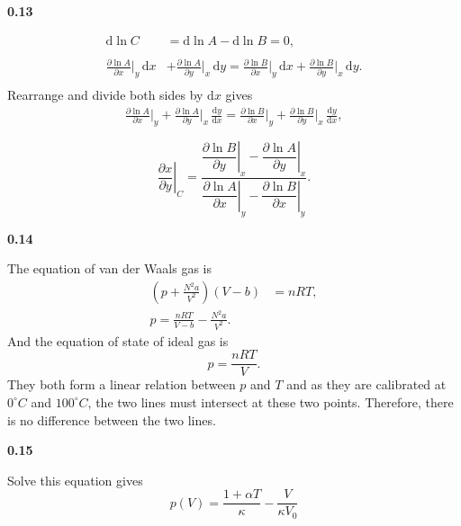 \documentclass[12pt]{article}
\newcommand{\problem}[2]{%
    \par\vspace{1em}
    \noindent\textbf{#1\quad #2}
    \par\smallskip
}
\begin{document}
\problem{0.13}{}
\begin{equation}
\begin{aligned}
     \mathrm{d}\ln{C}&= \mathrm{d}\ln{A} - \mathrm{d}\ln{B} = 0,\\
     \\
      \frac{\partial \ln{A}}{\partial x} \bigg|_y \, \mathrm{d}x &+ \frac{\partial \ln{A}}{\partial y} \bigg|_x \, \mathrm{d}y = \frac{\partial \ln{B}}{\partial x} \bigg|_y \, \mathrm{d}x + \frac{\partial \ln{B}}{\partial y} \bigg|_x \, \mathrm{d}y. \\
\end{aligned}
\end{equation}
Rearrange and divide both sides by $\mathrm{d}x$ gives
\begin{equation}
    \begin{aligned}
        \frac{\partial \ln{A}}{\partial x} \bigg|_y + \frac{\partial \ln{A}}{\partial y} \bigg|_x \, \frac{\mathrm{d}y}{\mathrm{d}x} = \frac{\partial \ln{B}}{\partial x} \bigg|_y + \frac{\partial \ln{B}}{\partial y} \bigg|_x \, \frac{\mathrm{d}y}{\mathrm{d}x},\\
        \\
    \end{aligned}
\end{equation}
\[
\left.\frac{\partial x}{\partial y}\right|_C
=
\frac{
\left.\dfrac{\partial\ln B}{\partial y}\right|_x
-
\left.\dfrac{\partial\ln A}{\partial y}\right|_x
}{
\left.\dfrac{\partial\ln A}{\partial x}\right|_y
-
\left.\dfrac{\partial\ln B}{\partial x}\right|_y
}.
\]


\problem{0.14}{}
The equation of van der Waals gas is
\begin{equation}
    \begin{aligned}
      \left(p + \frac{N^2a}{V^2}\right)(V-b) &= nRT,\\
      p = \frac{nRT}{V-b} - \frac{N^2a}{V^2}.
    \end{aligned}
\end{equation}
And the equation of state of ideal gas is
\begin{equation}
    p = \frac{nRT}{V}.
\end{equation}
They both form a linear relation between $p$ and $T$ and as they are calibrated at $0^\circ C$ and $100^\circ C$, the two lines must intersect at these two points. Therefore, there is no difference between the two lines.

\pagebreak

\problem{0.15}{}
Solve this equation gives
\begin{equation}
    p(V) = \frac{1 + \alpha T}{\kappa} - \frac{V}{\kappa V_0}
\end{equation}
\end{document}
